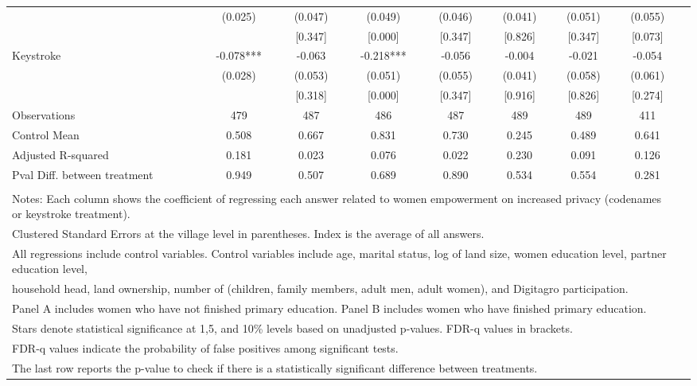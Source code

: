 \begin{tabular}{l*{8}{c}}
                    &     (0.025)   &     (0.047)   &     (0.049)   &     (0.046)   &     (0.041)   &     (0.051)   &     (0.055)   \\
                    &               &     [0.347]   &     [0.000]   &     [0.347]   &     [0.826]   &     [0.347]   &     [0.073]   \\
Keystroke           &      -0.078***&      -0.063   &      -0.218***&      -0.056   &      -0.004   &      -0.021   &      -0.054   \\
                    &     (0.028)   &     (0.053)   &     (0.051)   &     (0.055)   &     (0.041)   &     (0.058)   &     (0.061)   \\
                    &               &     [0.318]   &     [0.000]   &     [0.347]   &     [0.916]   &     [0.826]   &     [0.274]   \\
\hline
Observations        &         479   &         487   &         486   &         487   &         489   &         489   &         411   \\
Control Mean        &       0.508   &       0.667   &       0.831   &       0.730   &       0.245   &       0.489   &       0.641   \\
Adjusted R-squared  &       0.181   &       0.023   &       0.076   &       0.022   &       0.230   &       0.091   &       0.126   \\
Pval Diff. between treatment&       0.949   &       0.507   &       0.689   &       0.890   &       0.534   &       0.554   &       0.281   \\
\hline \\ \multicolumn{8}{l}{\tiny Notes: Each column shows the coefficient of regressing each answer related to women empowerment
on increased privacy (codenames or keystroke treatment).} \\ \multicolumn{8}{l}{\tiny Clustered Standard Errors at the village level in parentheses. Index is the average of all answers.} \\ \multicolumn{8}{l}{\tiny All regressions include control variables. Control variables include age, marital status, log of land size, women education level, partner education level, } \\ \multicolumn{8}{l}{\tiny household head, land ownership, number of (children, family members, adult men, adult women), and Digitagro participation.} \\  \multicolumn{8}{l}{\tiny Panel A includes women who have not finished primary education. Panel B includes women who have finished primary education. } \\ \multicolumn{8}{l}{\tiny Stars denote statistical significance at 1,5, and 10\% levels based on unadjusted p-values. FDR-q values in brackets.} \\ \multicolumn{8}{l}{\tiny FDR-q values indicate the probability of false positives among significant tests.} \\ \multicolumn{8}{l}{\tiny The last row reports the p-value to check if there is a statistically significant difference between treatments. } \\  \hline\hline \end{tabular}
